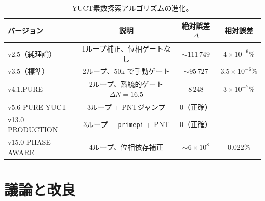 \documentclass[11pt,a4paper]{article}
\begin{document}
	\begin{table}[htbp]
		\centering
		\caption{YUCT素数探索アルゴリズムの進化。}
		\label{tab:all-versions}
		\begin{tabular}{l c c c}
			\toprule
			バージョン & 説明 & 絶対誤差 \(\Delta\) & 相対誤差 \\
			\midrule
			v2.5（純理論）  & 1ループ補正、位相ゲートなし & \(\sim 111\,749\) & \(4\times10^{-6}\%\) \\
			v3.5（標準）    & 2ループ、\(50\)k で手動ゲート & \(\sim 95\,727\) & \(3.5\times10^{-6}\%\) \\
			v4.1.PURE       & 2ループ、系統的ゲート \(\Delta N=16.5\) & \(8\,248\) & \(3\times10^{-7}\%\) \\
			v5.6 PURE YUCT  & 3ループ + PNTジャンプ & 0（正確） & -- \\
			v13.0 PRODUCTION & 3ループ + \texttt{primepi} + PNT & 0（正確） & -- \\
			v15.0 PHASE-AWARE & 4ループ、位相依存補正 & \(\sim 6\times10^{8}\) & \(0.022\%\) \\
			\bottomrule
		\end{tabular}
	\end{table}
	
	\section{議論と改良}
	\label{sec:discussion}
	
\end{document}
